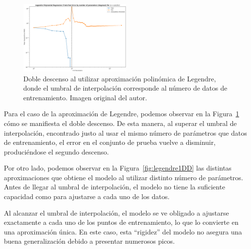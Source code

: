 \begin{figure}[h]
    \centering
    \includegraphics[width=0.5\textwidth]{img/experiments/legendre1DDD.png}
    \caption[Doble descenso al utilizar aproximación polinómica de Legendre.]{Doble descenso al utilizar aproximación polinómica de Legendre, donde el umbral de interpolación corresponde al número de datos de entrenamiento. Imagen original del autor.}\label{fig:legendre1DDD}
\end{figure}

Para el caso de la aproximación de Legendre, podemos observar en la Figura~\ref{fig:legendre1DDD} cómo se manifiesta el doble descenso. De esta manera, al superar el umbral de interpolación, encontrado justo al usar el mismo número de parámetros que datos de entrenamiento, el error en el conjunto de prueba vuelve a disminuir, produciéndose el segundo descenso.\newline

Por otro lado, podemos observar en la Figura~\ref{fig:legendre1DD} las distintas aproximaciones que obtiene el modelo al utilizar distinto número de parámetros. Antes de llegar al umbral de interpolación, el modelo no tiene la suficiente capacidad como para ajustarse a cada uno de los datos.\newline

Al alcanzar el umbral de interpolación, el modelo se ve obligado a ajustarse exactamente a cada uno de los puntos de entrenamiento, lo que lo convierte en una aproximación única. En este caso, esta ``rigidez'' del modelo no asegura una buena generalización debido a presentar numerosos picos.\newline


